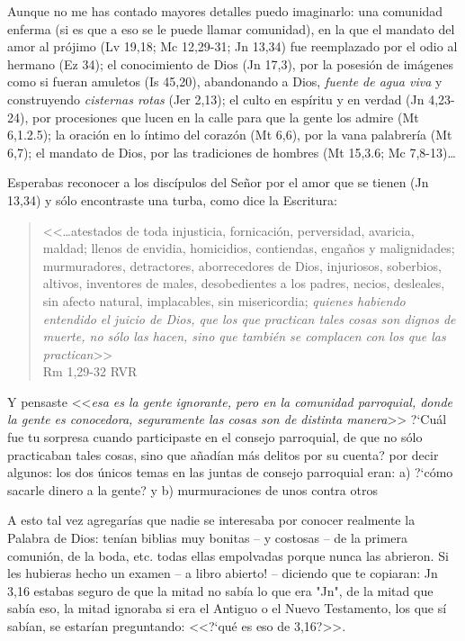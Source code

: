 \documentclass{article}
\begin{document}
Aunque no me has contado mayores detalles puedo imaginarlo: una comunidad enferma (si es que a eso se le puede llamar comunidad), en la que el mandato del amor al pr\'ojimo (Lv 19,18; Mc 12,29-31; Jn 13,34) fue reemplazado por el odio al hermano (Ez 34); el conocimiento de Dios (Jn 17,3), por la posesi\'on de im\'agenes como si fueran amuletos (Is 45,20), abandonando a Dios, \emph{fuente de agua viva} y construyendo \emph{cisternas rotas} (Jer 2,13); el culto en esp\'{i}ritu y en verdad (Jn 4,23-24), por procesiones que lucen en la calle para que la gente los admire (Mt 6,1.2.5); la oraci\'on en lo \'{i}ntimo del coraz\'on (Mt 6,6), por la vana palabrer\'{i}a (Mt 6,7); el mandato de Dios, por las tradiciones de hombres (Mt 15,3.6; Mc 7,8-13)\ldots

Esperabas reconocer a los disc\'{i}pulos del Se\~nor por el amor que se tienen (Jn 13,34) y s\'olo encontraste una turba, como dice la Escritura:

\begin{quote}
<<\ldots atestados de toda injusticia, fornicación, perversidad, avaricia, maldad; llenos de envidia, homicidios, contiendas, engaños y malignidades; murmuradores, detractores, aborrecedores de Dios, injuriosos, soberbios, altivos, inventores de males, desobedientes a los padres, necios, desleales, sin afecto natural, implacables, sin misericordia; \emph{quienes habiendo entendido el juicio de Dios, que los que practican tales cosas son dignos de muerte, no sólo las hacen, sino que también se complacen con los que las practican}>>\\
Rm 1,29-32 RVR
\end{quote}

\noindent
Y pensaste <<\emph{esa es la gente ignorante, pero en la comunidad parroquial, donde la gente es conocedora, seguramente las cosas son de distinta manera}>> ?`Cu\'al fue tu sorpresa cuando participaste en el consejo parroquial, de que no s\'olo practicaban tales cosas, sino que a\~nad\'{i}an m\'as delitos por su cuenta? por decir algunos: los dos \'unicos temas en las juntas de consejo parroquial eran: a) ?`c\'omo sacarle dinero a la gente? y b) murmuraciones de unos contra otros

A esto tal vez agregar\'{i}as que nadie se interesaba por conocer realmente la Palabra de Dios: ten\'{i}an biblias muy bonitas -- y costosas -- de la primera comuni\'on, de la boda, etc. todas ellas empolvadas porque nunca las abrieron. Si les hubieras hecho un examen -- a libro abierto! -- diciendo que te copiaran: Jn 3,16 estabas seguro de que la mitad no sab\'{i}a lo que era "Jn", de la mitad que sab\'{i}a eso, la mitad ignoraba si era el Antiguo o el Nuevo Testamento, los que s\'{i} sab\'{i}an, se estar\'{i}an preguntando: <<?`qu\'e es eso de 3,16?>>.
\end{document}
